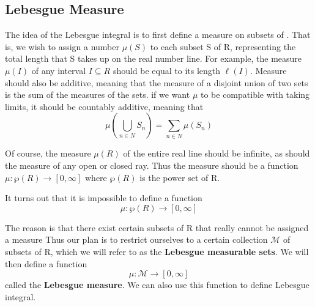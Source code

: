 

\subsection{Lebesgue Measure}
The idea of the Lebesgue integral is to first define a measure on subsets of . That
is, we wish to assign a number $\mu(S)$ to each subset S of R, representing the total
length that S takes up on the real number line. For example, the measure $\mu(I)$ of
any interval $I \subseteq R$ should be equal to its length $\ell(I)$. Measure should also be additive, meaning that the measure of a disjoint union of two sets is the sum of the measures of the sets. if we want $\mu$ to be compatible with taking limits, it should be countably
additive, meaning that $$\mu(\bigcup_{n \in N} S_{n}) = \sum_{n \in N} \mu(S_n) $$ 

\noindent Of course, the measure $\mu(R)$ of the entire real line should be infinite, as should the measure of any open or closed ray. Thus the measure should be a function
$ \mu: \wp(R) \rightarrow [0,\infty] $ 
where $\wp(R)$ is the power set of R.

\hfill

\noindent It turns out that it is impossible to define a function $$ \mu: \wp(R) \rightarrow [0,\infty] $$ 

The reason is that there exist certain subsets of R that really cannot be assigned
a measure
Thus our plan is to restrict ourselves to a certain collection $\mathcal{M}$ of subsets of R,
which we will refer to as the \textbf{Lebesgue measurable sets}. We will then define a
function
$$ \mu: \mathcal{M} \rightarrow [0,\infty] $$
called the \textbf{Lebesgue measure}. We can also use this function to define Lebesgue integral. 


